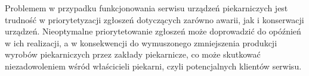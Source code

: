 Problemem w przypadku funkcjonowania serwisu urządzeń piekarniczych jest trudność w priorytetyzacji zgłoszeń
dotyczących zarówno awarii, jak i konserwacji urządzeń. Nieoptymalne priorytetowanie
zgłoszeń może doprowadzić do opóźnień w ich realizacji, a w konsekwencji do wymuszonego zmniejszenia produkcji
wyrobów piekarniczych przez zakłady piekarnicze, co może skutkować niezadowoleniem wśród właścicieli piekarni, czyli potencjalnych klientów serwisu.